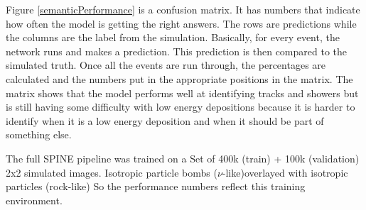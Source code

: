 Figure \ref{semanticPerformance}  is a confusion matrix. It has numbers that indicate how often the model is getting the right answers. The rows are predictions while the columns are the label from the simulation.
Basically, for every event, the network runs  and makes a prediction.
This prediction is then compared to the simulated truth.
Once all the events are run through, the percentages are calculated and the numbers put in the appropriate positions in the matrix.
The matrix shows that the model performs well at identifying tracks and showers but is still having  some difficulty with low energy depositions because it is harder to identify when it is a low energy deposition and when it should be part of something else.



The full SPINE pipeline was trained on a Set of 400k (train) + 100k (validation) 2x2 simulated images.
Isotropic particle bombs ($\nu$-like)overlayed with isotropic particles (rock-like)
So the performance numbers reflect this training environment.






